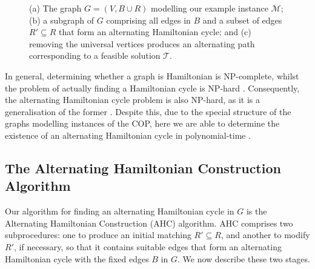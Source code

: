 \documentclass[a4paper,11pt,authoryear]{elsarticle}
\begin{document}
\begin{figure}[h!]	
	\centering
	\begin{subfigure}[b]{0.4\textwidth}
		
		\caption{}
		\label{fig:threshold2}
	\end{subfigure} \hspace{5mm}
	\begin{subfigure}[b]{0.4\textwidth}
		
		\caption{}
		\label{fig:althamcycleordered}
	\end{subfigure}
	\begin{subfigure}[b]{0.75\textwidth}
		
		\caption{}
		\label{fig:solutionpathsimple}
	\end{subfigure}
	\caption{(a) The graph $G=(V, B \cup R)$ modelling our example instance $\mathcal{M}$; (b) a subgraph of $G$ comprising all edges in $B$ and a subset of edges $R'\subseteq R$ that form an alternating Hamiltonian cycle; and (c) removing the universal vertices produces an alternating path corresponding to a feasible solution $\mathcal{T}$.}
	\label{fig:althamsoln}
\end{figure}

In general, determining whether a graph is Hamiltonian is NP-complete, whilst the problem of actually finding a Hamiltonian cycle is NP-hard \citep{karp1972}. Consequently, the alternating Hamiltonian cycle problem is also NP-hard, as it is a generalisation of the former \citep{haggkvist1977}. Despite this, due to the special structure of the graphs modelling instances of the COP, here we are able to determine the existence of an alternating Hamiltonian cycle in polynomial-time \citep{hawa2018}. 

\subsection{The Alternating Hamiltonian Construction Algorithm}
\label{sub:ahc}

\noindent Our algorithm for finding an alternating Hamiltonian cycle in $G$ is the Alternating Hamiltonian Construction (AHC) algorithm. AHC comprises two subprocedures: one to produce an initial matching $R' \subseteq R$, and another to modify $R'$, if necessary, so that it contains suitable edges that form an alternating Hamiltonian cycle with the fixed edges $B$ in $G$. We now describe these two stages.
\end{document}

